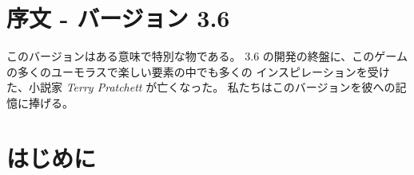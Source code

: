 \maketitle

\section{序文 - バージョン 3.6}
このバージョンはある意味で特別な物である。
3.6 の開発の終盤に、このゲームの多くのユーモラスで楽しい要素の中でも多くの
インスピレーションを受けた、小説家 {\it Terry Pratchett} が亡くなった。
私たちはこのバージョンを彼への記憶に捧げる。

\section{はじめに}


